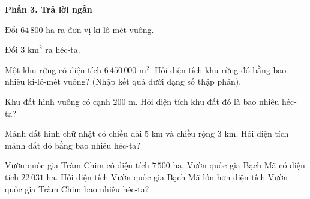 \textbf{Phần 3. Trả lời ngắn}

\begin{ex} %
Đổi $64\,800\text{ ha}$ ra đơn vị ki-lô-mét vuông.
\end{ex}

\begin{ex} %
Đổi $3\text{ km}^2$ ra héc-ta.
\end{ex}

\begin{ex} %
Một khu rừng có diện tích $6\,450\,000\text{ m}^2$. Hỏi diện tích khu rừng đó bằng bao nhiêu ki-lô-mét vuông? (Nhập kết quả dưới dạng số thập phân).
\end{ex}

\begin{ex} %
Khu đất hình vuông có cạnh $200\text{ m}$. Hỏi diện tích khu đất đó là bao nhiêu héc-ta?
\end{ex}

\begin{ex} %
Mảnh đất hình chữ nhật có chiều dài $5\text{ km}$ và chiều rộng $3\text{ km}$. Hỏi diện tích mảnh đất đó bằng bao nhiêu héc-ta?
\end{ex}

\begin{ex} %
Vườn quốc gia Tràm Chim có diện tích $7\,500\text{ ha}$, Vườn quốc gia Bạch Mã có diện tích $22\,031\text{ ha}$. Hỏi diện tích Vườn quốc gia Bạch Mã lớn hơn diện tích Vườn quốc gia Tràm Chim bao nhiêu héc-ta?
\end{ex}
